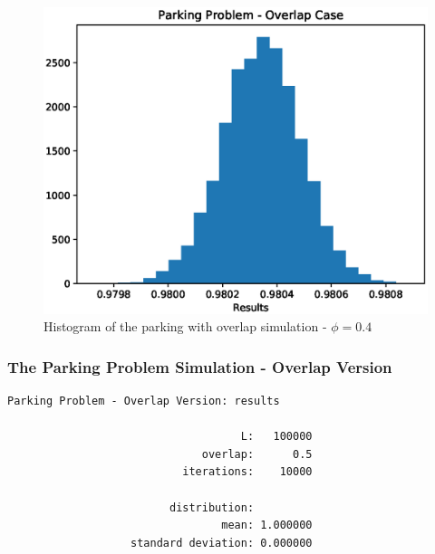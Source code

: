 \documentclass{beamer}
\begin{document}
\begin{frame}
	\begin{figure}
		\centering
		\includegraphics[scale = 0.5]{parking_simulation_06.eps}
		\caption{Histogram of the parking with overlap simulation - $\phi = 0.4$}
	\end{figure}
\end{frame}

\begin{frame}[fragile]
    \frametitle{The Parking Problem Simulation - Overlap Version}
	\begin{lstlisting}[numbers=none]
    Parking Problem - Overlap Version: results

                                    L:   100000
                              overlap:      0.5
                           iterations:    10000

                         distribution:
                                 mean: 1.000000
                   standard deviation: 0.000000

	\end{lstlisting}
\end{frame}
\end{document}
